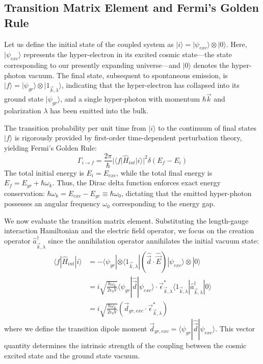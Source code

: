 \subsection{Transition Matrix Element and Fermi's Golden Rule}
Let us define the initial state of the coupled system as $|i\rangle = |\psi_{exc}\rangle \otimes |0\rangle$. Here, $|\psi_{exc}\rangle$ represents the hyper-electron in its excited cosmic state---the state corresponding to our presently expanding universe---and $|0\rangle$ denotes the hyper-photon vacuum. The final state, subsequent to spontaneous emission, is $|f\rangle = |\psi_{gr}\rangle \otimes |1_{\vec{k}, \lambda}\rangle$, indicating that the hyper-electron has collapsed into its ground state $|\psi_{gr}\rangle$, and a single hyper-photon with momentum $\hbar\vec{k}$ and polarization $\lambda$ has been emitted into the bulk.

The transition probability per unit time from $|i\rangle$ to the continuum of final states $|f\rangle$ is rigorously provided by first-order time-dependent perturbation theory, yielding Fermi's Golden Rule:
\begin{equation}
    \Gamma_{i \to f} = \frac{2\pi}{\hbar} |\langle f | \hat{H}_{int} | i \rangle|^2 \delta(E_f - E_i)
\end{equation}
The total initial energy is $E_i = E_{exc}$, while the total final energy is $E_f = E_{gr} + \hbar \omega_k$. Thus, the Dirac delta function enforces exact energy conservation: $\hbar \omega_k = E_{exc} - E_{gr} \equiv \hbar \omega_{0}$, dictating that the emitted hyper-photon possesses an angular frequency $\omega_0$ corresponding to the energy gap.

We now evaluate the transition matrix element. Substituting the length-gauge interaction Hamiltonian and the electric field operator, we focus on the creation operator $\hat{a}_{\vec{k}, \lambda}^\dagger$ since the annihilation operator annihilates the initial vacuum state:
\begin{align}
    \langle f | \hat{H}_{int} | i \rangle &= - \langle \psi_{gr} | \otimes \langle 1_{\vec{k}, \lambda} | \left( \hat{\vec{d}} \cdot \hat{\vec{E}} \right) |\psi_{exc}\rangle \otimes |0\rangle \nonumber \\
    &= i \sqrt{\frac{\hbar \omega_k}{2 \epsilon_0 V}} \langle \psi_{gr} | \hat{\vec{d}} | \psi_{exc} \rangle \cdot \vec{\epsilon}_{\vec{k}, \lambda}^* \langle 1_{\vec{k}, \lambda} | \hat{a}_{\vec{k}, \lambda}^\dagger | 0 \rangle \nonumber \\
    &= i \sqrt{\frac{\hbar \omega_k}{2 \epsilon_0 V}} \left( \vec{d}_{gr, exc} \cdot \vec{\epsilon}_{\vec{k}, \lambda}^* \right)
\end{align}
where we define the transition dipole moment $\vec{d}_{gr, exc} = \langle \psi_{gr} | \hat{\vec{d}} | \psi_{exc} \rangle$. This vector quantity determines the intrinsic strength of the coupling between the cosmic excited state and the ground state vacuum.

